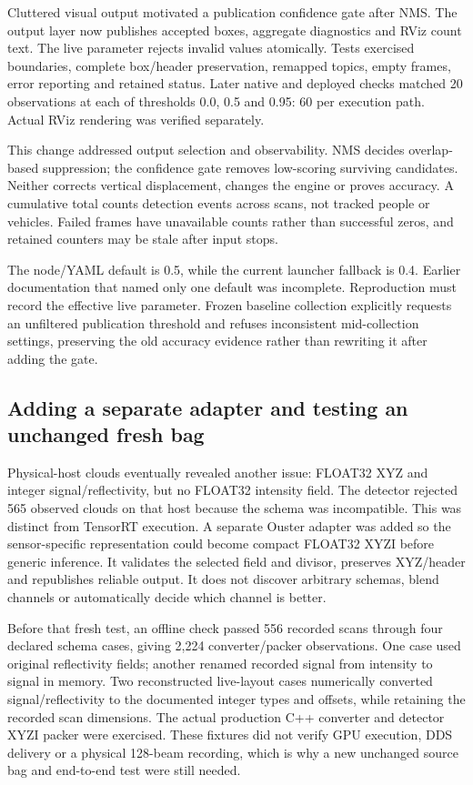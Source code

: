 \documentclass[11pt,a4paper]{article}
\begin{document}
Cluttered visual output motivated a publication confidence gate after NMS. The output layer now publishes accepted boxes, aggregate diagnostics and RViz count text. The live parameter rejects invalid values atomically. Tests exercised boundaries, complete box/header preservation, remapped topics, empty frames, error reporting and retained status. Later native and deployed checks matched 20 observations at each of thresholds 0.0, 0.5 and 0.95: 60 per execution path. Actual RViz rendering was verified separately.

This change addressed output selection and observability. NMS decides overlap-based suppression; the confidence gate removes low-scoring surviving candidates. Neither corrects vertical displacement, changes the engine or proves accuracy. A cumulative total counts detection events across scans, not tracked people or vehicles. Failed frames have unavailable counts rather than successful zeros, and retained counters may be stale after input stops.

The node/YAML default is 0.5, while the current launcher fallback is 0.4. Earlier documentation that named only one default was incomplete. Reproduction must record the effective live parameter. Frozen baseline collection explicitly requests an unfiltered publication threshold and refuses inconsistent mid-collection settings, preserving the old accuracy evidence rather than rewriting it after adding the gate.

\subsection{Adding a separate adapter and testing an unchanged fresh bag}

Physical-host clouds eventually revealed another issue: FLOAT32 XYZ and integer signal/reflectivity, but no FLOAT32 intensity field. The detector rejected 565 observed clouds on that host because the schema was incompatible. This was distinct from TensorRT execution. A separate Ouster adapter was added so the sensor-specific representation could become compact FLOAT32 XYZI before generic inference. It validates the selected field and divisor, preserves XYZ/header and republishes reliable output. It does not discover arbitrary schemas, blend channels or automatically decide which channel is better.

Before that fresh test, an offline check passed 556 recorded scans through four declared schema cases, giving 2,224 converter/packer observations. One case used original reflectivity fields; another renamed recorded signal from intensity to signal in memory. Two reconstructed live-layout cases numerically converted signal/reflectivity to the documented integer types and offsets, while retaining the recorded scan dimensions. The actual production C++ converter and detector XYZI packer were exercised. These fixtures did not verify GPU execution, DDS delivery or a physical 128-beam recording, which is why a new unchanged source bag and end-to-end test were still needed.
\end{document}
